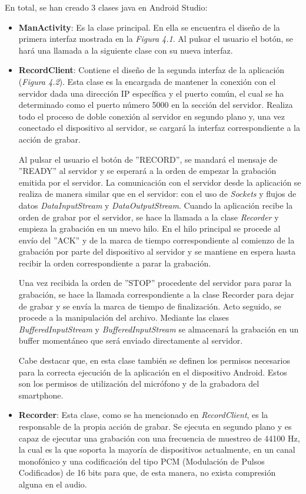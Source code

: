 \documentclass[a4paper,11pt]{book}
\begin{document}
	En total, se han creado 3 clases java en Android Studio:
	\begin{itemize}
	\item \textbf{ManActivity}: Es la clase principal. En ella se encuentra el diseño de la primera interfaz mostrada en la \textit{Figura 4.1}. Al pulsar el usuario el botón, se hará una llamada a la siguiente clase con su nueva interfaz.
	\item \textbf{RecordClient}: Contiene el diseño de la segunda interfaz de la aplicación (\textit{Figura 4.2}). Esta clase es la encargada de mantener la conexión con el servidor dada una dirección IP específica y el puerto común, el cual se ha determinado como el puerto número 5000 en la sección del servidor. Realiza todo el proceso de doble conexión al servidor en segundo plano y, una vez conectado el dispositivo al servidor, se cargará la interfaz correspondiente a la acción de grabar.
	
	Al pulsar el usuario el botón de ''RECORD'', se mandará el mensaje de ''READY'' al servidor y se esperará a la orden de empezar la grabación emitida por el servidor. La comunicación con el servidor desde la aplicación se realiza de manera similar que en el servidor: con el uso de \textit{Sockets} y flujos de datos \textit{DataInputStream} y \textit{DataOutputStream}. Cuando la aplicación recibe la orden de grabar por el servidor, se hace la llamada a la clase \textit{Recorder} y empieza la grabación en un nuevo hilo. En el hilo principal se procede al envío del ''ACK'' y de la marca de tiempo correspondiente al comienzo de la grabación por parte del dispositivo al servidor y se mantiene en espera hasta recibir la orden correspondiente a parar la grabación.
	
	Una vez recibida la orden de ''STOP'' procedente del servidor para parar la grabación, se hace la llamada correspondiente a la clase Recorder para dejar de grabar y se envía la marca de tiempo de finalización. Acto seguido, se procede a la manipulación del archivo. Mediante las clases \textit{BufferedInputStream} y \textit{BufferedInputStream} se almacenará la grabación en un buffer momentáneo que será enviado directamente al servidor.
	
	Cabe destacar que, en esta clase también se definen los permisos necesarios para la correcta ejecución de la aplicación en el dispositivo Android. Estos son los permisos de utilización del micrófono y de la grabadora del smartphone.
	
	\item \textbf{Recorder}: Esta clase, como se ha mencionado en \textit{RecordClient}, es la responsable de la propia acción de grabar. Se ejecuta en segundo plano y es capaz de ejecutar una grabación con una frecuencia de muestreo de 44100 Hz, la cual es la que soporta la mayoría de dispositivos actualmente, en un canal monofónico y una codificación del tipo PCM (Modulación de Pulsos Codificados) de 16 bits para que, de esta manera, no exista compresión alguna en el audio.
	

\end{itemize}
\end{document}
